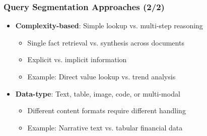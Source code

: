 \begin{frame}
    \frametitle{Query Segmentation Approaches (2/2)}
    \begin{itemize}
        \item \textbf{Complexity-based}: Simple lookup vs. multi-step reasoning
        \begin{itemize}
            \item Single fact retrieval vs. synthesis across documents
            \item Explicit vs. implicit information
            \item Example: Direct value lookup vs. trend analysis
        \end{itemize}
        \item \textbf{Data-type}: Text, table, image, code, or multi-modal
        \begin{itemize}
            \item Different content formats require different handling
            \item Example: Narrative text vs. tabular financial data
        \end{itemize}
    \end{itemize}
\end{frame}

